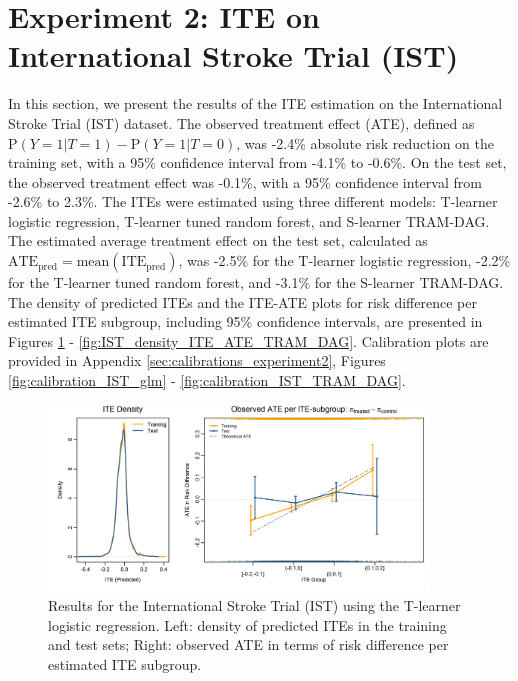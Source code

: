 \clearpage


\section{Experiment 2: ITE on International Stroke Trial (IST)} \label{sec:results_experiment2}


In this section, we present the results of the ITE estimation on the International Stroke Trial (IST) dataset. The observed treatment effect (ATE), defined as $\text{P}(Y=1|T=1) - \text{P}(Y=1|T=0)$, was -2.4\% absolute risk reduction on the training set, with a 95\% confidence interval from -4.1\% to -0.6\%. On the test set, the observed treatment effect was -0.1\%, with a 95\% confidence interval from -2.6\% to 2.3\%. The ITEs were estimated using three different models: T-learner logistic regression, T-learner tuned random forest, and S-learner TRAM-DAG. The estimated average treatment effect on the test set, calculated as $\text{ATE}_\text{pred}=\text{mean}(\text{ITE}_\text{pred})$, was -2.5\% for the T-learner logistic regression, -2.2\% for the T-learner tuned random forest, and -3.1\% for the S-learner TRAM-DAG. The density of predicted ITEs and the ITE-ATE plots for risk difference per estimated ITE subgroup, including 95\% confidence intervals, are presented in Figures \ref{fig:IST_density_ITE_ATE_glm_tlearner} - \ref{fig:IST_density_ITE_ATE_TRAM_DAG}. Calibration plots are provided in Appendix \ref{sec:calibrations_experiment2}, Figures \ref{fig:calibration_IST_glm} - \ref{fig:calibration_IST_TRAM_DAG}. 




\begin{figure}[htbp]
\centering
\includegraphics[width=0.9\textwidth]{img/results_IST/glm_tlearner_density_ITE_ATE.png}
\caption{Results for the International Stroke Trial (IST) using the T-learner logistic regression. Left: density of predicted ITEs in the training and test sets; Right: observed ATE in terms of risk difference per estimated ITE subgroup.}
\label{fig:IST_density_ITE_ATE_glm_tlearner}
\end{figure}



